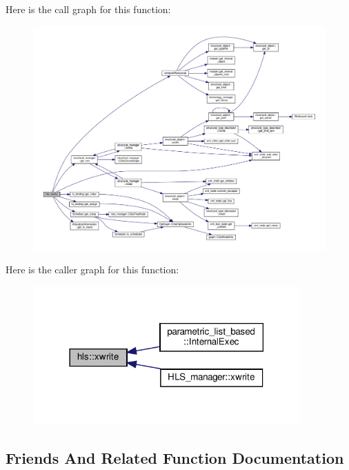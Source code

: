 Here is the call graph for this function\+:
\nopagebreak
\begin{figure}[H]
\begin{center}
\leavevmode
\includegraphics[width=350pt]{d5/d18/classhls_a49a13fe020ba1c669604ed1140612378_cgraph}
\end{center}
\end{figure}
Here is the caller graph for this function\+:
\nopagebreak
\begin{figure}[H]
\begin{center}
\leavevmode
\includegraphics[width=290pt]{d5/d18/classhls_a49a13fe020ba1c669604ed1140612378_icgraph}
\end{center}
\end{figure}


\subsection{Friends And Related Function Documentation}
\mbox{\label{classhls_a3b25e051db859b21027f26e73fc19d71}} 
